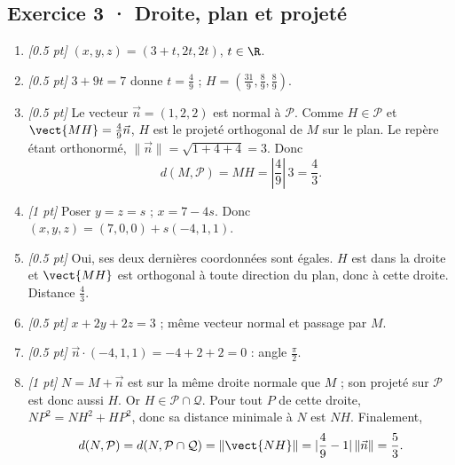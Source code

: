 \subsection*{Exercice 3 · Droite, plan et projeté}\begin{enumerate}

\item \textit{[\num{0,5} pt]} $(x,y,z)=(3+t,2t,2t)$, $t\in\R$.

\item \textit{[\num{0,5} pt]} $3+9t=7$ donne $t=\frac{4}{9}$ ; $H=(\frac{31}{9},\frac{8}{9},\frac{8}{9})$.

\item \textit{[\num{0,5} pt]} Le vecteur $\vec n=(1,2,2)$ est normal à $\mathcal P$. Comme $H\in\mathcal P$ et $\vect{MH}=\frac{4}{9}\vec n$, $H$ est le projeté orthogonal de $M$ sur le plan. Le repère étant orthonormé, $\|\vec n\|=\sqrt{1+4+4}=3$. Donc
\[d(M,\mathcal P)=MH=|\frac{4}{9}|\,3=\frac{4}{3}.\]

\item \textit{[1 pt]} Poser $y=z=s$ ; $x=7-4s$. Donc $(x,y,z)=(7,0,0)+s(-4,1,1)$.

\item \textit{[\num{0,5} pt]} Oui, ses deux dernières coordonnées sont égales. $H$ est dans la droite et $\vect{MH}$ est orthogonal à toute direction du plan, donc à cette droite. Distance $\frac{4}{3}$.

\item \textit{[\num{0,5} pt]} $x+2y+2z=3$ ; même vecteur normal et passage par $M$.

\item \textit{[\num{0,5} pt]} $\vec n\cdot(-4,1,1)=-4+2+2=0$ : angle $\frac{\pi}{2}$.

\item \textit{[1 pt]} $N=M+\vec n$ est sur la même droite normale que $M$ ; son projeté sur $\mathcal P$ est donc aussi $H$. Or $H\in\mathcal P\cap\mathcal Q$. Pour tout $P$ de cette droite, $NP^2=NH^2+HP^2$, donc sa distance minimale à $N$ est $NH$. Finalement,
\[d(N,\mathcal P)=d(N,\mathcal P\cap\mathcal Q)=\|\vect{NH}\|=|\frac{4}{9}-1|\,\|\vec n\|=\frac{5}{3}.\]

\end{enumerate}

